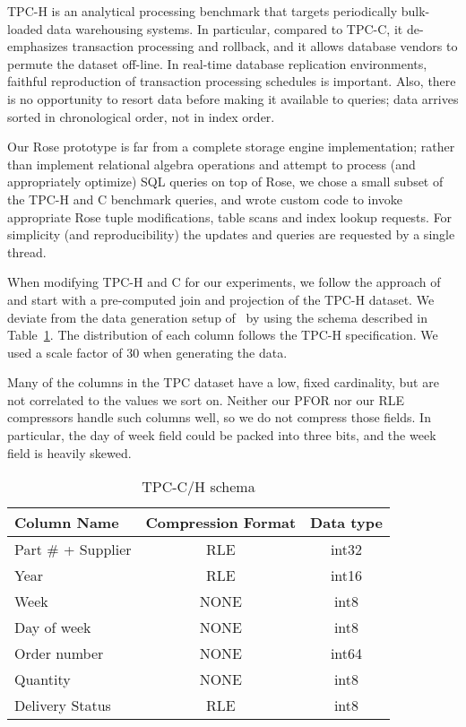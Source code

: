 \documentclass{vldb}
\newcommand{\rows}{Rose\xspace}
\begin{document}
TPC-H is an analytical processing benchmark that targets periodically
bulk-loaded data warehousing systems.  In particular, compared to
TPC-C, it de-emphasizes transaction processing and rollback, and it
allows database vendors to permute the dataset off-line.  In real-time
database replication environments, faithful reproduction of
transaction processing schedules is important.  Also, there is no
opportunity to resort data before making it available to queries; data
arrives sorted in chronological order, not in index order.

Our \rows prototype is far from a complete storage engine
implementation; rather than implement relational algebra operations
and attempt to process (and appropriately optimize) SQL queries on top
of \rows, we chose a small subset of the TPC-H and C benchmark
queries, and wrote custom code to invoke appropriate \rows tuple
modifications, table scans and index lookup requests.  For simplicity
(and reproducibility) the updates and queries are requested by a
single thread.

When modifying TPC-H and C for our experiments, we follow the approach
of~\cite{entropy,bitsForChronos} and start with a pre-computed join
and projection of the TPC-H dataset.  We deviate from the data
generation setup of~\cite{bitsForChronos} by using the schema
described in Table~\ref{tab:tpc-schema}.  The distribution of each
column follows the TPC-H specification.  We used a scale factor of 30
when generating the data.

Many of the columns in the
TPC dataset have a low, fixed cardinality, but are not correlated to the values we sort on.
Neither our PFOR nor our RLE compressors handle such columns well, so
we do not compress those fields.  In particular, the day of week field
could be packed into three bits, and the week field is heavily skewed.

\begin{table}
\caption{TPC-C/H schema}
\centering
\label{tab:tpc-schema}
\begin{tabular}{|l|c|c|} \hline
Column Name     & Compression Format &  Data type\\ \hline
Part \# + Supplier & RLE       & int32              \\ \hline
Year            & RLE       & int16              \\\hline
Week            & NONE      & int8               \\\hline
Day of week     & NONE      & int8               \\\hline
Order number    & NONE      & int64              \\\hline
Quantity        & NONE      & int8               \\\hline
Delivery Status & RLE       & int8               \\\hline
\end{tabular}
\end{table}
\end{document}
